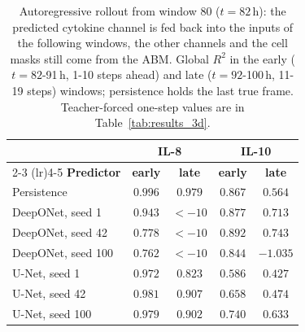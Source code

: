 \begin{table}[!htbp]
\caption{Autoregressive rollout from window 80 ($t=82$\,h): the predicted cytokine channel is fed back into the inputs of the following windows, the other channels and the cell masks still come from the ABM. Global $R^2$ in the early ($t=82$-91\,h, 1-10 steps ahead) and late ($t=92$-100\,h, 11-19 steps) windows; persistence holds the last true frame. Teacher-forced one-step values are in Table~\ref{tab:results_3d}.}
\label{tab:rollout}
\centering\footnotesize
\begin{tabular}{lcccc}
\toprule
& \multicolumn{2}{c}{\textbf{IL-8}} & \multicolumn{2}{c}{\textbf{IL-10}} \\
\cmidrule(lr){2-3} \cmidrule(lr){4-5}
\textbf{Predictor} & \textbf{early} & \textbf{late} & \textbf{early} & \textbf{late} \\
\midrule
Persistence & $0.996$ & $0.979$ & $0.867$ & $0.564$ \\
DeepONet, seed 1 & $0.943$ & $<-10$ & $0.877$ & $0.713$ \\
DeepONet, seed 42 & $0.778$ & $<-10$ & $0.892$ & $0.743$ \\
DeepONet, seed 100 & $0.762$ & $<-10$ & $0.844$ & $-1.035$ \\
U-Net, seed 1 & $0.972$ & $0.823$ & $0.586$ & $0.427$ \\
U-Net, seed 42 & $0.981$ & $0.907$ & $0.658$ & $0.474$ \\
U-Net, seed 100 & $0.979$ & $0.902$ & $0.740$ & $0.633$ \\
\bottomrule
\end{tabular}
\end{table}

